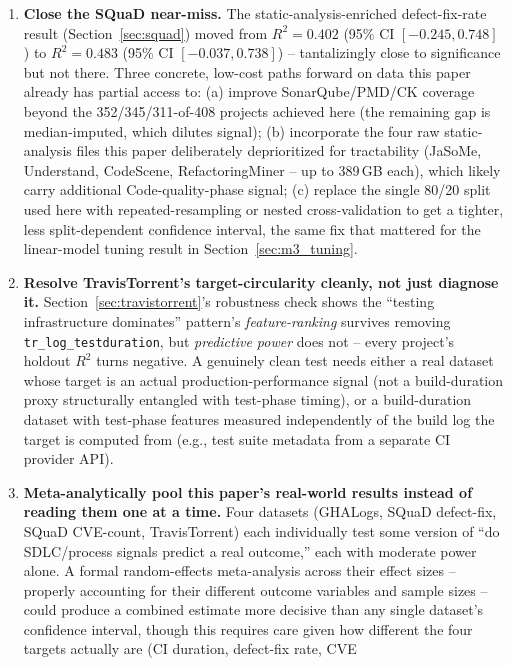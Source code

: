 \documentclass[technologies,article,submit,pdftex,moreauthors]{Definitions/mdpi}
\begin{document}
\begin{enumerate}
\item \textbf{Close the SQuaD near-miss.} The static-analysis-enriched
  defect-fix-rate result (Section~\ref{sec:squad}) moved from
  \(R^2=0.402\) (95\% CI \([-0.245, 0.748]\)) to \(R^2=0.483\) (95\% CI
  \([-0.037, 0.738]\)) -- tantalizingly close to significance but not
  there. Three concrete, low-cost paths forward on data this paper
  already has partial access to: (a) improve SonarQube/PMD/CK coverage
  beyond the 352/345/311-of-408 projects achieved here (the remaining
  gap is median-imputed, which dilutes signal); (b) incorporate the
  four raw static-analysis files this paper deliberately deprioritized
  for tractability (JaSoMe, Understand, CodeScene, RefactoringMiner --
  up to 389\,GB each), which likely carry additional Code-quality-phase
  signal; (c) replace the single 80/20 split used here with
  repeated-resampling or nested cross-validation to get a tighter,
  less split-dependent confidence interval, the same fix that mattered
  for the linear-model tuning result in Section~\ref{sec:m3_tuning}.
\item \textbf{Resolve TravisTorrent's target-circularity cleanly, not
  just diagnose it.} Section~\ref{sec:travistorrent}'s robustness
  check shows the ``testing infrastructure dominates'' pattern's
  \emph{feature-ranking} survives removing \texttt{tr\_\allowbreak log\_\allowbreak testduration},
  but \emph{predictive power} does not -- every project's holdout
  \(R^2\) turns negative. A genuinely clean test needs either a real
  dataset whose target is an actual production-performance signal
  (not a build-duration proxy structurally entangled with test-phase
  timing), or a build-duration dataset with test-phase features
  measured independently of the build log the target is computed from
  (e.g., test suite metadata from a separate CI provider API).
\item \textbf{Meta-analytically pool this paper's real-world results
  instead of reading them one at a time.} Four datasets (GHALogs,
  SQuaD defect-fix, SQuaD CVE-count, TravisTorrent) each individually
  test some version of ``do SDLC/process signals predict a real
  outcome,'' each with moderate power alone. A formal random-effects
  meta-analysis across their effect sizes -- properly accounting for
  their different outcome variables and sample sizes -- could produce
  a combined estimate more decisive than any single dataset's
  confidence interval, though this requires care given how different
  the four targets actually are (CI duration, defect-fix rate, CVE

\end{enumerate}
\end{document}
